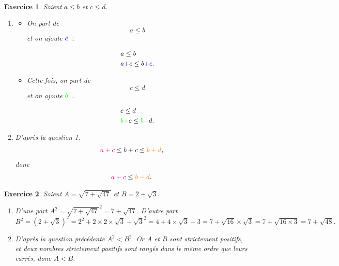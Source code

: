 \documentclass[10pt]{article}
\newtheorem{exo}{Exercice}
\begin{document}
\begin{exo}

Soient $a\leq b$ et $c\leq d.$

\begin{enumerate}
\item 

\begin{itemize}
\item[\textbullet] On part de \[a\leq b\] et on ajoute $\textcolor{blue}{c}~:$

\begin{align*}
&a\leq b\\&a\textcolor{blue}{+c}\leq b\textcolor{blue}{+c}.\end{align*}

\item[\textbullet] Cette fois, on part de \[c\leq d\] et on ajoute $\textcolor{green}{b}~:$

\begin{align*}
&c\leq d\\&\textcolor{green}{b+}c\leq \textcolor{green}{b+}d.\end{align*}
\end{itemize}
\item D'après la question 1, \[\textcolor{magenta}{a+c}\leq b+c\leq \textcolor{orange}{b+d},\] donc \[\textcolor{magenta}{a+c}\leq \textcolor{orange}{b+d}.\]
\end{enumerate}

\end{exo}

\begin{exo}

Soient $A=\sqrt{7+\sqrt{47}}$ et $ B=2+\sqrt{3}.$
\begin{enumerate}
\item D'une part $A^2=\sqrt{7+\sqrt{47}}^2=7+\sqrt{47}.$ D'autre part
\[B^2=\left(2+\sqrt{3}\right)^2=2^2+2\times 2\times \sqrt{3}+\sqrt{3}^2=4+4\times \sqrt{3}+3=7+\sqrt{16}\times\sqrt{3}=7+\sqrt{16\times 3}=7+\sqrt{48}.\]

\item D'après la question précédente $A^2<B^2.$ Or $A$ et $B$ sont strictement positifs, et deux nombres strictement positifs sont rangés dans le même ordre que leurs carrés, donc $A<B.$
\end{enumerate}
\end{exo}
\end{document}
